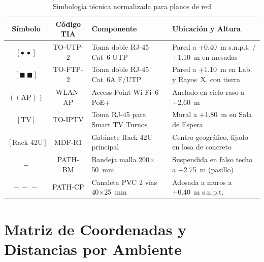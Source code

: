 \begin{table}[H]
\centering
\caption{Simbología técnica normalizada para planos de red}
\begin{tabularx}{\textwidth}{@{}cclX@{}}
\toprule
\textbf{Símbolo} & \textbf{Código TIA} & \textbf{Componente} & \textbf{Ubicación y Altura} \\
\midrule
$[\bullet\ \bullet]$ & TO-UTP-2  & Toma doble RJ-45 Cat~6 UTP      & Pared a +0.40~m s.n.p.t. / +1.10~m en mesadas \\
$[\blacksquare\ \blacksquare]$  & TO-FTP-2  & Toma doble RJ-45 Cat~6A F/UTP   & Pared a +1.10~m en Lab. y Rayos~X, con tierra \\
$((\text{AP}))$      & WLAN-AP   & Access Point Wi-Fi~6 PoE+       & Anclado en cielo raso a +2.60~m \\
$[\text{TV}]$        & TO-IPTV   & Toma RJ-45 para Smart TV Turnos & Mural a +1.80~m en Sala de Espera \\
$[\text{Rack 42U}]$  & MDF-R1    & Gabinete Rack 42U principal     & Centro geográfico, fijado en losa de concreto \\
$\equiv$             & PATH-BM   & Bandeja malla 200$\times$50~mm  & Suspendida en falso techo a +2.75~m (pasillo) \\
$-\,-\,-$            & PATH-CP   & Canaleta PVC 2 vías 40$\times$25~mm & Adosada a muros a +0.40~m s.n.p.t. \\
\bottomrule
\end{tabularx}
\label{tab:simbologia}
\end{table}

\section{Matriz de Coordenadas y Distancias por Ambiente}

